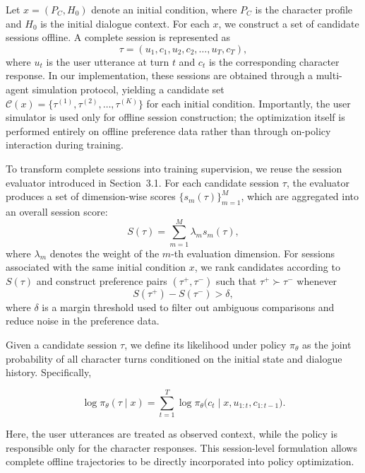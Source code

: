 Let \(x = (P_C, H_0)\) denote an initial condition, where \(P_C\) is the character profile and \(H_0\) is the initial dialogue context. For each \(x\), we construct a set of candidate sessions offline. A complete session is represented as
\begin{equation}
\tau = (u_1, c_1, u_2, c_2, \ldots, u_T, c_T),
\end{equation}
where \(u_t\) is the user utterance at turn \(t\) and \(c_t\) is the corresponding character response. In our implementation, these sessions are obtained through a multi-agent simulation protocol, yielding a candidate set \(\mathcal{C}(x) = \{\tau^{(1)}, \tau^{(2)}, \ldots, \tau^{(K)}\}\) for each initial condition. Importantly, the user simulator is used only for offline session construction; the optimization itself is performed entirely on offline preference data rather than through on-policy interaction during training.

To transform complete sessions into training supervision, we reuse the session evaluator introduced in Section~3.1. For each candidate session \(\tau\), the evaluator produces a set of dimension-wise scores \(\{s_m(\tau)\}_{m=1}^{M}\), which are aggregated into an overall session score:
\begin{equation}
S(\tau) = \sum_{m=1}^{M} \lambda_m s_m(\tau),
\end{equation}
where \(\lambda_m\) denotes the weight of the \(m\)-th evaluation dimension. For sessions associated with the same initial condition \(x\), we rank candidates according to \(S(\tau)\) and construct preference pairs \((\tau^{+}, \tau^{-})\) such that \(\tau^{+} \succ \tau^{-}\) whenever
\begin{equation}
S(\tau^{+}) - S(\tau^{-}) > \delta,
\end{equation}
where \(\delta\) is a margin threshold used to filter out ambiguous comparisons and reduce noise in the preference data.

Given a candidate session \(\tau\), we define its likelihood under policy \(\pi_{\theta}\) as the joint probability of all character turns conditioned on the initial state and dialogue history. Specifically,

\begin{equation}
    \log \pi_{\theta}(\tau \mid x)
=
\sum_{t=1}^{T}
\log \pi_{\theta}\bigl(c_t \mid x, u_{1:t}, c_{1:t-1}\bigr).
\end{equation}


Here, the user utterances are treated as observed context, while the policy is responsible only for the character responses. This session-level formulation allows complete offline trajectories to be directly incorporated into policy optimization.

